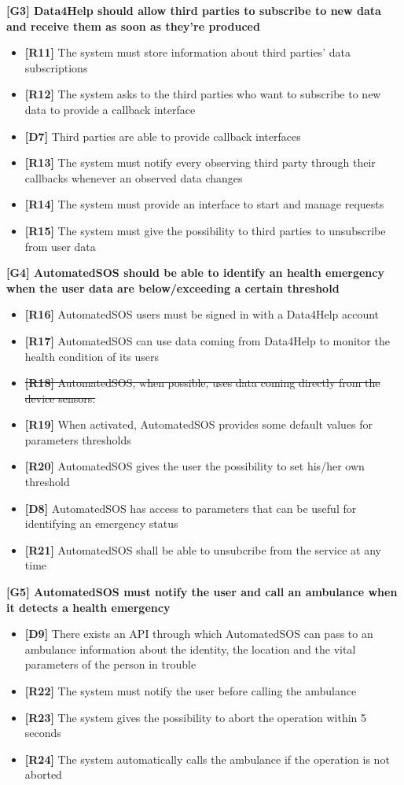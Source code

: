 \textbf{[G3] Data4Help should allow third parties to subscribe to new data and receive them as soon as they're produced}

\begin{itemize}
	\item \textbf{[R11]} The system must store information about third parties' data subscriptions
	\item \textbf{[R12]} The system asks to the third parties who want to subscribe to new data to provide a callback interface
	\item \textbf{[D7]} Third parties are able to provide callback interfaces
	\item \textbf{[R13]} The system must notify every observing third party through their callbacks whenever an observed data changes
	\item \textbf{[R14]} The system must provide an interface to start and manage requests
	\item \textbf{[R15]} The system must give the possibility to third parties to unsubscribe from user data
\end{itemize}

\textbf{[G4] AutomatedSOS should be able to identify an health emergency when the user data are below/exceeding a certain threshold}
\begin{itemize}
	\item \textbf{[R16]} AutomatedSOS users must be signed in with a Data4Help account
	\item \textbf{[R17]} AutomatedSOS can use data coming from Data4Help to monitor the health condition of its users
	\item \sout{\textbf{[R18]} AutomatedSOS, when possible, uses data coming directly from the device sensors.}
	\item \textbf{[R19]} When activated, AutomatedSOS provides some default values for parameters thresholds
	\item \textbf{[R20]} AutomatedSOS gives the user the possibility to set his/her own threshold 
	\item \textbf{[D8]} AutomatedSOS has access to parameters that can be useful for identifying an emergency status
	\item \textbf{[R21]} AutomatedSOS shall be able to unsubcribe from the service at any time
\end{itemize}

\textbf{[G5] AutomatedSOS must notify the user and call an ambulance when it detects a health emergency}
\begin{itemize}
	\item \textbf{[D9]} There exists an API through which AutomatedSOS can pass to an ambulance information about the identity, the location and the vital parameters of the person in trouble
	\item \textbf{[R22]} The system must notify the user before calling the ambulance
	\item \textbf{[R23]} The system gives the possibility to abort the operation within 5 seconds
	\item \textbf{[R24]} The system automatically calls the ambulance if the operation is not aborted
\end{itemize}


